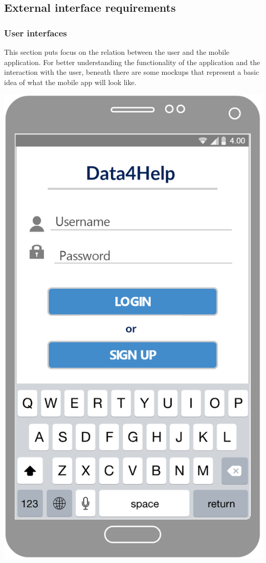 \subsection{External interface requirements}
\subsubsection{User interfaces}
This section puts focus on the relation between the user and the mobile application. For better understanding the functionality of the application and the interaction with the user, beneath there are some mockups that represent a basic idea of what the mobile app will look like.

\begin{center}
\begin{minipage}[c]{.40\textwidth}
\centering
\includegraphics[width=1\textwidth]{Images/userInterface/Login}

\end{minipage}
\end{center}
